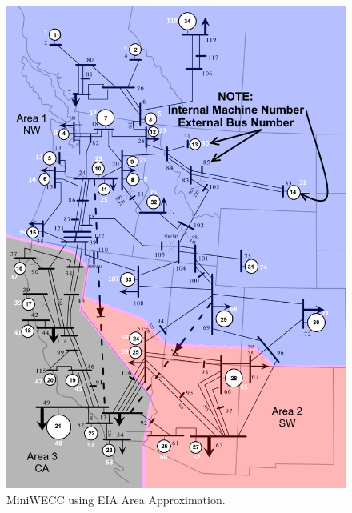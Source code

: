 \begin{figure}[H]
	\centering
	\footnotesize
	\includegraphics[width=\linewidth]{examples/miniWECC/miniWECC-split03-EIA}
	\caption{MiniWECC using EIA Area Approximation.}
	\label{fig: mw area option 2}
\end{figure}%


